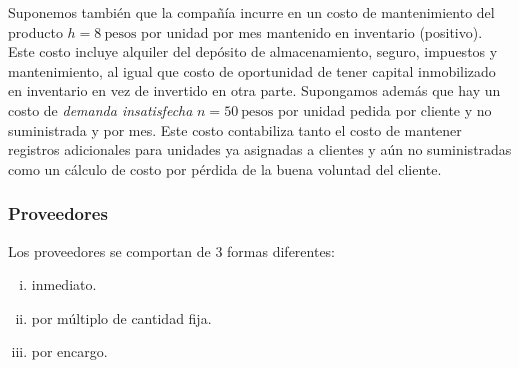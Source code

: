 \documentclass[10pt]{article}
\begin{document}
Suponemos también que la compañía incurre en un costo de mantenimiento del producto $h = 8~\textrm{pesos}$ por unidad por mes mantenido en inventario (positivo). Este costo incluye alquiler del depósito de almacenamiento, seguro, impuestos y mantenimiento, al igual que costo de oportunidad de tener capital inmobilizado en inventario en vez de invertido en otra parte. Supongamos además que hay un costo de \textit{demanda insatisfecha} $n = 50~\textrm{pesos}$ por unidad pedida por cliente y no suministrada y por mes. Este costo contabiliza tanto el costo de mantener registros adicionales para unidades ya asignadas a clientes y aún no suministradas como un cálculo de costo por pérdida de la buena voluntad del cliente.


\subsubsection{Proveedores}

Los proveedores se comportan de 3 formas diferentes: 
\begin{enumerate}[i)]
\item inmediato.
\item por múltiplo de cantidad fija.
\item por encargo.
\end{enumerate}
\end{document}
